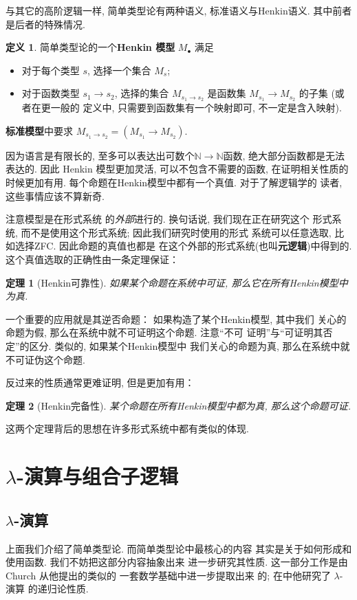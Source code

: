 \documentclass[UTF8]{ctexbook}
\theoremstyle{plain}
\newtheorem{theorem}{定理}[chapter]
\theoremstyle{definition}
\newtheorem{definition}{定义}[chapter]
\theoremstyle{remark}
\begin{document}
与其它的高阶逻辑一样, 简单类型论有两种语义, 标准语义与Henkin语义.
其中前者是后者的特殊情况.

\begin{definition}
简单类型论的一个\textbf{Henkin 模型} \(M_\bullet\) 满足
\begin{itemize}
\item 对于每个类型 \(s\), 选择一个集合 \(M_s\);
\item 对于函数类型 \(s_1 \to s_2\), 选择的集合 \(M_{s_1 \to s_2}\)
是函数集 \(M_{s_1} \to M_{s_2}\) 的子集 (或者在更一般的
定义中, 只需要到函数集有一个映射即可, 不一定是含入映射).
\end{itemize}
\textbf{标准模型}中要求 \(M_{s_1 \to s_2} = (M_{s_1} \to M_{s_2})\).
\end{definition}
因为语言是有限长的, 至多可以表达出可数个\(\mathbb N \to \mathbb N\)函数,
绝大部分函数都是无法表达的. 因此 Henkin 模型更加灵活,
可以不包含不需要的函数, 在证明相关性质的时候更加有用.
每个命题在Henkin模型中都有一个真值. 对于了解逻辑学的
读者, 这些事情应该不算新奇.

注意模型是在形式系统
的\emph{外部}进行的. 换句话说, 我们现在正在研究这个
形式系统, 而不是使用这个形式系统; 因此我们研究时使用的形式
系统可以任意选取, 比如选择ZFC. 因此命题的真值也都是
在这个外部的形式系统(也叫\textbf{元逻辑})中得到的.
这个真值选取的正确性由一条定理保证：
\begin{theorem}[Henkin可靠性]
如果某个命题在系统中可证, 那么它在所有Henkin模型中为真.
\end{theorem}
一个重要的应用就是其逆否命题：
如果构造了某个Henkin模型, 其中我们
关心的命题为假, 那么在系统中就不可证明这个命题. 注意“不可
证明”与“可证明其否定”的区分. 类似的, 如果某个Henkin模型中
我们关心的命题为真, 那么在系统中就不可证伪这个命题.

反过来的性质通常更难证明, 但是更加有用：
\begin{theorem}[Henkin完备性]
某个命题在所有Henkin模型中都为真, 那么这个命题可证.
\end{theorem}
这两个定理背后的思想在许多形式系统中都有类似的体现.

\section{\texorpdfstring{\(\lambda\)}{Lambda}-演算与组合子逻辑}
\subsection{\texorpdfstring{\(\lambda\)}{Lambda}-演算}
上面我们介绍了简单类型论. 而简单类型论中最核心的内容
其实是关于如何形成和使用函数. 我们不妨把这部分内容抽象出来
进一步研究其性质. 这一部分工作是由 Church 从他提出的类似的
一套数学基础\cite{church:1932:untyped}中进一步提取出来
的; 在\cite{church:1936:lambda}中他研究了 \(\lambda\)-演算
的递归论性质.
\end{document}
